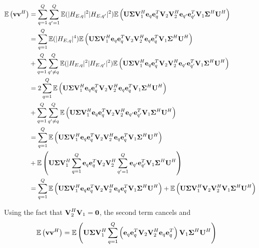 \begin{subequations}
\begin{align}
\mathbb{E}\left(\vect{v}\vect{v}^H\right)&=\sum_{q=1}^Q\sum_{q'=1}^Q\mathbb{E}(|H_{E,q}|^2|H_{E,q'}|^2)\mathbb{E}\left(\mat{U} \mat{\Sigma}\mat{V}_1^H  \vect{e}_q \vect{e}_q^T \mat{V}_2 \mat{V}_2^H \vect{e}_{q'} \vect{e}_{q'}^T\mat{V}_1 \mat{\Sigma}^H   \mat{U}^H\right)\\
&=\sum_{q=1}^Q\mathbb{E}(|H_{E,q}|^4)\mathbb{E}\left(\mat{U} \mat{\Sigma}\mat{V}_1^H  \vect{e}_q \vect{e}_q^T \mat{V}_2 \mat{V}_2^H \vect{e}_{q} \vect{e}_{q}^T\mat{V}_1 \mat{\Sigma}^H   \mat{U}^H\right)\\
&+\sum_{q=1}^Q\sum_{q'\neq q}^Q\mathbb{E}(|H_{E,q}|^2|H_{E,q'}|^2)\mathbb{E}\left(\mat{U} \mat{\Sigma}\mat{V}_1^H  \vect{e}_q \vect{e}_q^T \mat{V}_2 \mat{V}_2^H \vect{e}_{q'} \vect{e}_{q'}^T\mat{V}_1 \mat{\Sigma}^H   \mat{U}^H\right)\\
&=2\sum_{q=1}^Q\mathbb{E}\left(\mat{U} \mat{\Sigma}\mat{V}_1^H  \vect{e}_q \vect{e}_q^T \mat{V}_2 \mat{V}_2^H \vect{e}_{q} \vect{e}_{q}^T\mat{V}_1 \mat{\Sigma}^H   \mat{U}^H\right)\\
&+\sum_{q=1}^Q\sum_{q'\neq q}^Q\mathbb{E}\left(\mat{U} \mat{\Sigma}\mat{V}_1^H  \vect{e}_q \vect{e}_q^T \mat{V}_2 \mat{V}_2^H \vect{e}_{q'} \vect{e}_{q'}^T\mat{V}_1 \mat{\Sigma}^H   \mat{U}^H\right)\\
&=\sum_{q=1}^Q\mathbb{E}\left(\mat{U} \mat{\Sigma}\mat{V}_1^H  \vect{e}_q \vect{e}_q^T \mat{V}_2 \mat{V}_2^H \vect{e}_{q} \vect{e}_{q}^T\mat{V}_1 \mat{\Sigma}^H   \mat{U}^H\right)\\
&+\mathbb{E}\left(\mat{U} \mat{\Sigma}\mat{V}_1^H \sum_{q=1}^Q \vect{e}_q \vect{e}_q^T \mat{V}_2 \mat{V}_2^H \sum_{q'=1}^Q\vect{e}_{q'} \vect{e}_{q'}^T\mat{V}_1 \mat{\Sigma}^H   \mat{U}^H\right)\\
&=\sum_{q=1}^Q\mathbb{E}\left(\mat{U} \mat{\Sigma}\mat{V}_1^H  \vect{e}_q \vect{e}_q^T \mat{V}_2 \mat{V}_2^H \vect{e}_{q} \vect{e}_{q}^T\mat{V}_1 \mat{\Sigma}^H   \mat{U}^H\right)+\mathbb{E}\left(\mat{U} \mat{\Sigma}\mat{V}_1^H  \mat{V}_2 \mat{V}_2^H \mat{V}_1 \mat{\Sigma}^H   \mat{U}^H\right)
\end{align}
\end{subequations}

Using the fact that $\mat{V}_2^H \mat{V}_1=\mat{0}$, the second term cancels and
\begin{align}
\mathbb{E}\left(\vect{v}\vect{v}^H\right)&=\mathbb{E}\left(\mat{U} \mat{\Sigma}\mat{V}_1^H  \sum_{q=1}^Q\left(\vect{e}_q \vect{e}_q^T \mat{V}_2 \mat{V}_2^H \vect{e}_{q} \vect{e}_{q}^T\right)\mat{V}_1 \mat{\Sigma}^H   \mat{U}^H\right)
\end{align}

